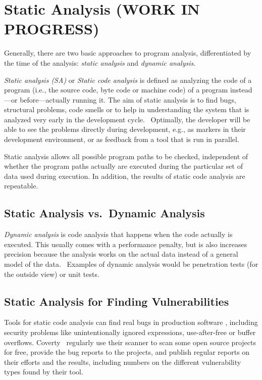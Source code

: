 \chapter{Static Analysis (WORK IN PROGRESS)}
\label{static-analysis}

Generally, there are two basic approaches to program analysis, differentiated by the time of the analysis: \emph{static analysis} and \emph{dynamic analysis}.

\emph{Static analysis (SA)} or \emph{Static code analysis} is defined as analyzing the code of a program (i.e., the source code, byte code or machine code) of a program instead---or before---actually running it. The aim of static analysis is to find bugs, structural problems, code smells or to help in understanding the system that is analyzed very early in the development cycle.~\cite{data-flow-analysis, chess-west} Optimally, the developer will be able to see the problems directly during development, e.g., as markers in their development environment, or as feedback from a tool that is run in parallel.

Static analysis allows all possible program paths to be checked, independent of whether the program paths actually are executed during the particular set of data used during execution. In addition, the results of static code analysis are repeatable.~\cite{coverity-report}

\section{Static Analysis vs.~Dynamic Analysis}

\emph{Dynamic analysis} is code analysis that happens when the code actually is executed. This usually comes with a performance penalty, but is also increases precision because the analysis works on the actual data instead of a general model of the data.~\cite{chess-west} Examples of dynamic analysis would be penetration tests (for the outside view) or unit tests.

\section{Static Analysis for Finding Vulnerabilities}

Tools for static code analysis can find real bugs in production software \cite{findbugs, evaluating}, including security problems like unintentionally ignored expressions, use-after-free or buffer overflows. Coverty~\cite{coverity-report} regularly use their scanner to scan some open source projects for free, provide the bug reports to the projects, and publish regular reports on their efforts and the results, including numbers on the different vulnerability types found by their tool.

